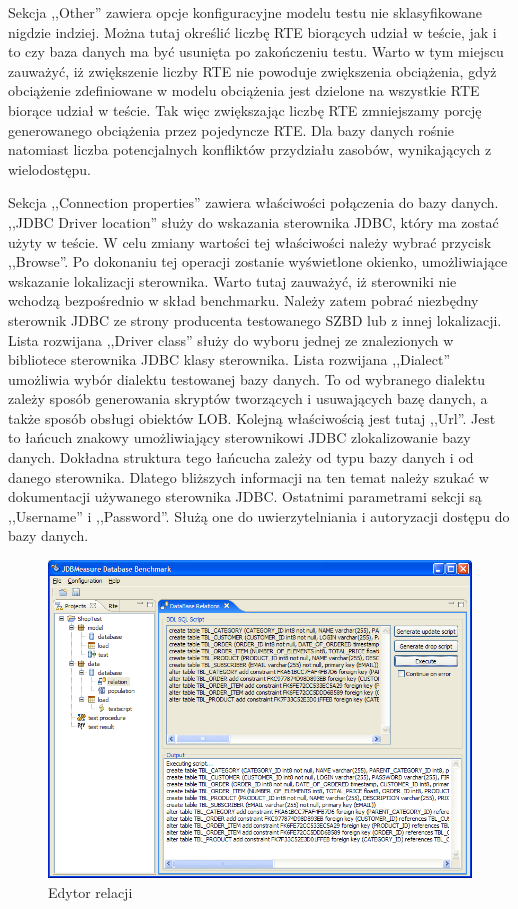 Sekcja ,,Other'' zawiera opcje konfiguracyjne modelu testu nie sklasyfikowane nigdzie indziej. Można
tutaj określić liczbę RTE biorących udział w teście, jak i to czy baza danych ma być usunięta po zakończeniu testu.
Warto w tym miejscu zauważyć, iż zwiększenie liczby RTE nie powoduje zwiększenia obciążenia, gdyż obciążenie zdefiniowane
w modelu obciążenia jest dzielone na wszystkie RTE biorące udział w teście. Tak więc zwiększając liczbę RTE zmniejszamy
porcję generowanego obciążenia przez pojedyncze RTE. Dla bazy danych rośnie natomiast liczba potencjalnych konfliktów
przydziału zasobów, wynikających z wielodostępu.

Sekcja ,,Connection properties'' zawiera właściwości połączenia do bazy danych. ,,JDBC Driver location'' służy do wskazania
sterownika JDBC, który ma zostać użyty w teście. W celu zmiany wartości tej właściwości należy wybrać przycisk ,,Browse''.
Po dokonaniu tej operacji zostanie wyświetlone okienko, umożliwiające wskazanie lokalizacji sterownika. Warto tutaj zauważyć,
iż sterowniki nie wchodzą bezpośrednio w skład benchmarku. Należy zatem pobrać niezbędny sterownik JDBC ze strony producenta 
testowanego SZBD lub z innej lokalizacji. Lista rozwijana ,,Driver class'' służy do wyboru jednej ze znalezionych w bibliotece 
sterownika JDBC klasy sterownika. Lista rozwijana ,,Dialect'' umożliwia wybór dialektu testowanej bazy danych. To od wybranego dialektu
zależy sposób generowania skryptów tworzących i usuwających bazę danych, a także sposób obsługi obiektów LOB. Kolejną właściwością
jest tutaj ,,Url''. Jest to łańcuch znakowy umożliwiający sterownikowi JDBC zlokalizowanie bazy danych. Dokładna struktura
tego łańcucha zależy od typu bazy danych i od danego sterownika. Dlatego bliższych informacji na ten temat należy szukać w dokumentacji 
używanego sterownika JDBC. Ostatnimi parametrami sekcji są ,,Username'' i ,,Password''. Służą one do uwierzytelniania i 
autoryzacji dostępu do bazy danych.

\begin{figure}[!h]
\begin{center}
\includegraphics[width=0.9\linewidth]{figures/gui/18.png}
\end{center}
\caption{Edytor relacji}\label{rys:relationsedytor}
\end{figure}

